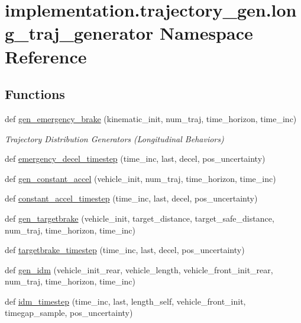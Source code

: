 \hypertarget{namespaceimplementation_1_1trajectory__gen_1_1long__traj__generator}{}\section{implementation.\+trajectory\+\_\+gen.\+long\+\_\+traj\+\_\+generator Namespace Reference}
\label{namespaceimplementation_1_1trajectory__gen_1_1long__traj__generator}
\subsection*{Functions}
\begin{DoxyCompactItemize}
\item 
def \hyperlink{namespaceimplementation_1_1trajectory__gen_1_1long__traj__generator_abab5ca0c002bcc1d49ed946801d1a6cd}{gen\+\_\+emergency\+\_\+brake} (kinematic\+\_\+init, num\+\_\+traj, time\+\_\+horizon, time\+\_\+inc)
\begin{DoxyCompactList}\small\item\em Trajectory Distribution Generators (Longitudinal Behaviors) \end{DoxyCompactList}\item 
def \hyperlink{namespaceimplementation_1_1trajectory__gen_1_1long__traj__generator_ae6886eee49b41b72f63fc1bd9122b640}{emergency\+\_\+decel\+\_\+timestep} (time\+\_\+inc, last, decel, pos\+\_\+uncertainty)
\item 
def \hyperlink{namespaceimplementation_1_1trajectory__gen_1_1long__traj__generator_a95deda59df2ca0517c120e2e9127902e}{gen\+\_\+constant\+\_\+accel} (vehicle\+\_\+init, num\+\_\+traj, time\+\_\+horizon, time\+\_\+inc)
\item 
def \hyperlink{namespaceimplementation_1_1trajectory__gen_1_1long__traj__generator_ac6d2399614f9ae63889799ed25d7c0be}{constant\+\_\+accel\+\_\+timestep} (time\+\_\+inc, last, decel, pos\+\_\+uncertainty)
\item 
def \hyperlink{namespaceimplementation_1_1trajectory__gen_1_1long__traj__generator_a12ce3e10c9f5dd915bcc5d7154f4d3ea}{gen\+\_\+targetbrake} (vehicle\+\_\+init, target\+\_\+distance, target\+\_\+safe\+\_\+distance, num\+\_\+traj, time\+\_\+horizon, time\+\_\+inc)
\item 
def \hyperlink{namespaceimplementation_1_1trajectory__gen_1_1long__traj__generator_a0b4c1aa1f7d053b4cb95069b4f8b5396}{targetbrake\+\_\+timestep} (time\+\_\+inc, last, decel, pos\+\_\+uncertainty)
\item 
def \hyperlink{namespaceimplementation_1_1trajectory__gen_1_1long__traj__generator_a65ed7a53d1026b133b588a638a88280e}{gen\+\_\+idm} (vehicle\+\_\+init\+\_\+rear, vehicle\+\_\+length, vehicle\+\_\+front\+\_\+init\+\_\+rear, num\+\_\+traj, time\+\_\+horizon, time\+\_\+inc)
\item 
def \hyperlink{namespaceimplementation_1_1trajectory__gen_1_1long__traj__generator_a51193f332a666f040d34d0e8376b296f}{idm\+\_\+timestep} (time\+\_\+inc, last, length\+\_\+self, vehicle\+\_\+front\+\_\+init, timegap\+\_\+sample, pos\+\_\+uncertainty)
\end{DoxyCompactItemize}


